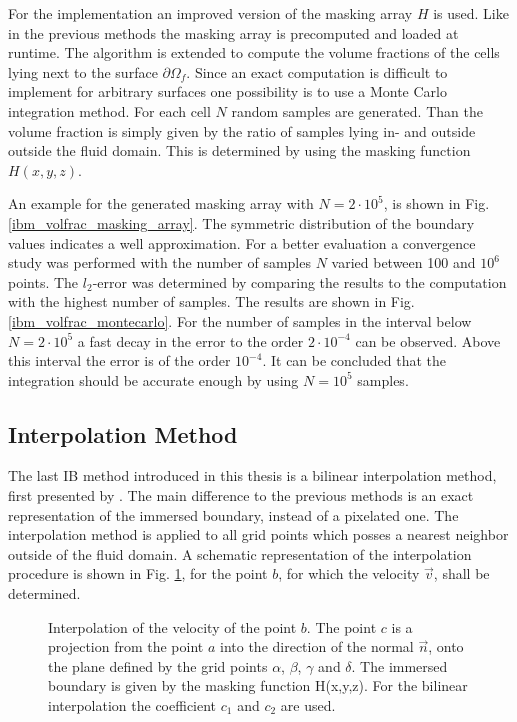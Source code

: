 For the implementation an improved version of the masking array $H$ is used.
Like in the previous methods the masking array is precomputed and loaded at runtime. The algorithm is extended to compute the
volume fractions of the cells lying next to the surface $\partial\Omega_f$.
Since an exact computation is difficult to implement for arbitrary surfaces one possibility is to use a Monte Carlo integration method.
For each cell $N$ random samples are generated. Than the volume fraction is simply given by the ratio of samples lying in- and outside outside the fluid domain.
This is determined by using the masking function $H(x, y, z)$.

An example for the generated masking array with $N=2\cdot10^{5}$, is shown in Fig. \ref{ibm_volfrac_masking_array}.
The symmetric distribution of the boundary values indicates
a well approximation. For a better evaluation a convergence study was performed with the number of samples $N$ varied between 100 and $10^6$ points.
The $l_2$-error was determined by comparing the results to the computation with the highest number of samples.
The results are shown in Fig. \ref{ibm_volfrac_montecarlo}.
For the number of samples in the interval below $N=2\cdot10^5$  a fast decay in the error to the order $2\cdot10^{-4}$ can be observed.
Above this interval the error is of the order $10^{-4}$.
It can be concluded that the integration should be accurate enough by using $N=10^5$ samples.

\clearpage
\subsection{Interpolation Method}

The last IB method introduced in this thesis is a bilinear interpolation method, first presented by \citep{Gilmanov2003}.
The main difference to the previous methods is an exact representation of the immersed boundary, instead of a pixelated one.
The interpolation method is applied to all grid points which posses a nearest neighbor outside of the fluid domain.
A schematic representation of the interpolation procedure is shown in Fig. \ref{ibm:ip_method_algo},
for the point $b$, for which the velocity $\vec{v}$, shall be determined.

\begin{figure}[!bp]
      \centering
      \caption{Interpolation of the velocity of the point $b$. The point $c$ is a projection from the point $a$ into the direction of the normal $\vec{n}$,
       onto the plane defined by the grid points $\alpha$, $\beta$, $\gamma$ and $\delta$. The immersed boundary is given by the masking function H(x,y,z).
       For the bilinear interpolation the coefficient $c_1$ and $c_2$ are used.
      }
    \label{ibm:ip_method_algo}
\end{figure}

